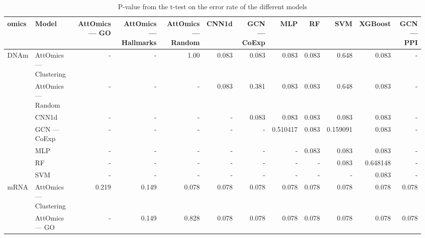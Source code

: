 \begin{landscape}
	\begin{table}
		\tiny
		\centering
		\caption{P-value from the t-test on the error rate of the different models}\label{tab:pval_error_rate}
		\begin{tabular}{llrrrrrrrrrr}
			\toprule
			omics                  & Model                   & AttOmics --- GO & AttOmics --- Hallmarks & AttOmics --- Random & CNN1d & GCN --- CoExp & MLP      & RF    & SVM      & XGBoost  & GCN --- PPI \\
			\midrule
			\multirow{7}{*}{DNAm}  & AttOmics --- Clustering & -               & -                      & 1.00                & 0.083 & 0.083         & 0.083    & 0.083 & 0.648    & 0.083    & -           \\
			                       & AttOmics --- Random     & -               & -                      & -                   & 0.083 & 0.381         & 0.083    & 0.083 & 0.648    & 0.083    & -           \\
			                       & CNN1d                   & -               & -                      & -                   & -     & 0.083         & 0.083    & 0.083 & 0.083    & 0.083    & -           \\
			                       & GCN --- CoExp           & -               & -                      & -                   & -     & -             & 0.510417 & 0.083 & 0.159091 & 0.083    & -           \\
			                       & MLP                     & -               & -                      & -                   & -     & -             & -        & 0.083 & 0.083    & 0.083    & -           \\
			                       & RF                      & -               & -                      & -                   & -     & -             & -        & -     & 0.083    & 0.648148 & -           \\
			                       & SVM                     & -               & -                      & -                   & -     & -             & -        & -     & -        & 0.083    & -           \\
			\midrule
			\multirow{10}{*}{mRNA} & AttOmics --- Clustering & 0.219           & 0.149                  & 0.078               & 0.078 & 0.078         & 0.078    & 0.078 & 0.078    & 0.078    & 0.078       \\
			                       & AttOmics --- GO         & -               & 0.149                  & 0.828               & 0.078 & 0.078         & 0.078    & 0.078 & 0.078    & 0.078    & 0.078       \\

\end{tabular}
\end{table}
\end{landscape}
